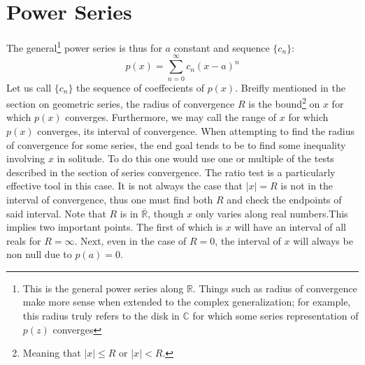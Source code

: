 \documentclass[11pt]{article}
\newcommand{\abs}[1]{\left| #1 \right|}
\begin{document}
\section*{Power Series}
	The general\footnote{This is the general power series along $\mathbb{R}$. Things such as radius of convergence make more sense when extended
	to the complex generalization; for example, this radius truly refers to the disk in $\mathbb{C}$ for which some series representation of $p(z)$ 
	converges} power series is thus for $a$ constant and sequence $\{c_n\}$:
		\begin{equation}
			p(x) = \sum_{n = 0}^{\infty} c_n (x - a)^n
		\end{equation}
	Let us call $\{c_n\}$ the sequence of coeffecients of $p(x)$. Breifly mentioned in the section on geometric series, 
	the radius of convergence $R$ is the bound\footnote{Meaning that $\abs{x} \leq R$ 
	or $\abs{x} < R$.} on $x$ for which $p(x)$ converges. Furthermore, we may call the range of $x$ for which $p(x)$ converges, its interval
	of convergence. When attempting to find the radius of convergence for some series, the end goal tends to be to find some inequality
	involving $x$ in solitude. To do this one would use one or multiple of the tests described in the section of series convergence. The ratio
	test is a particularly effective tool in this case. It is not always the case that $\abs{x} = R$ is not in the interval of convergence, thus
	one must find both $R$ and check the endpoints of said interval. Note that $R$ is in $\overline{\mathbb{R}}$, though $x$ only varies 
	along real numbers.This implies two important points. The first of which is $x$ will have an interval of all reals for $R=\infty$. Next, 
	even in the case of $R = 0$, the interval of $x$ will always be non null due to $p(a) = 0$.
\end{document}

